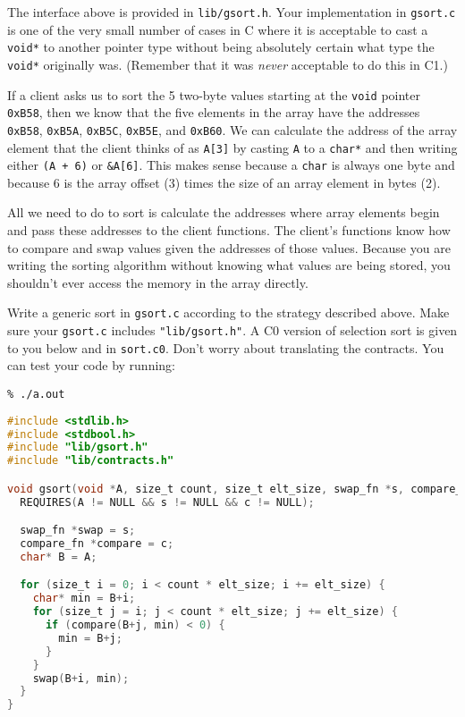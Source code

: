 The interface above is provided in \lstinline'lib/gsort.h'.  Your
implementation in \lstinline'gsort.c' is one of the very small number
of cases in C where it is acceptable to cast a \lstinline'void*' to
another pointer type without being absolutely certain what type the
\lstinline'void*' originally was. (Remember that it was \emph{never}
acceptable to do this in C1.)

If a client asks us to sort the 5 two-byte values starting at the
\lstinline'void' pointer \lstinline'0xB58', then we know that the five
elements in the array have the addresses \lstinline'0xB58',
\lstinline'0xB5A', \lstinline'0xB5C', \lstinline'0xB5E', and
\lstinline'0xB60'. We can calculate the address of the array element
that the client thinks of as \lstinline'A[3]' by casting \lstinline'A'
to a \lstinline'char*' and then writing either \lstinline'(A + 6)' or
\lstinline'&A[6]'. This makes sense because a \lstinline'char' is
always one byte and because 6 is the array offset (3) times the size
of an array element in bytes (2).

\onePT

All we need to do to sort is calculate the addresses where array
elements begin and pass these addresses to the client functions. The
client's functions know how to compare and swap values given the
addresses of those values.  Because you are writing the sorting
algorithm without knowing what values are being stored, you shouldn't
ever access the memory in the array directly.

\begin{part}
  Write a generic sort in \lstinline'gsort.c' according to the
  strategy described above. Make sure your \lstinline'gsort.c'
  includes \lstinline'"lib/gsort.h"'. A C0 version of selection sort
  is given to you below and in \lstinline'sort.c0'. Don't worry about
  translating the contracts.  You can test your code by running:
\begin{lstlisting}[language={[coin]C}]
% make
% ./a.out
\end{lstlisting}

\twoPT

\begin{solution}
\begin{lstlisting}[language=C]
#include <stdlib.h>
#include <stdbool.h>
#include "lib/gsort.h"
#include "lib/contracts.h"

void gsort(void *A, size_t count, size_t elt_size, swap_fn *s, compare_fn *c) {
  REQUIRES(A != NULL && s != NULL && c != NULL);

  swap_fn *swap = s;
  compare_fn *compare = c;
  char* B = A;

  for (size_t i = 0; i < count * elt_size; i += elt_size) {
    char* min = B+i;
    for (size_t j = i; j < count * elt_size; j += elt_size) {
      if (compare(B+j, min) < 0) {
        min = B+j;
      }
    }
    swap(B+i, min);
  }
}
\end{lstlisting}
\end{solution}
\end{part}

